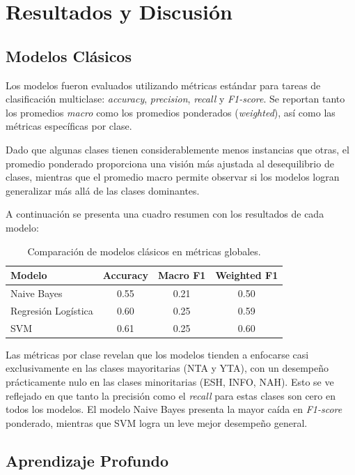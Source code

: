 \section{Resultados y Discusión}

\subsection{Modelos Clásicos}

Los modelos fueron evaluados utilizando métricas estándar para tareas de clasificación multiclase: \textit{accuracy}, \textit{precision}, \textit{recall} y \textit{F1-score}. Se reportan tanto los promedios \textit{macro} como los promedios ponderados (\textit{weighted}), así como las métricas específicas por clase.

Dado que algunas clases tienen considerablemente menos instancias que otras, el promedio ponderado proporciona una visión más ajustada al desequilibrio de clases, mientras que el promedio macro permite observar si los modelos logran generalizar más allá de las clases dominantes.

A continuación se presenta una cuadro resumen con los resultados de cada modelo:

\begin{table}[H]
\centering
\caption{Comparación de modelos clásicos en métricas globales.}
\begin{tabular}{lccc}
\toprule
\textbf{Modelo} & \textbf{Accuracy} & \textbf{Macro F1} & \textbf{Weighted F1} \\
\midrule
Naive Bayes            & 0.55 & 0.21 & 0.50 \\
Regresión Logística    & 0.60 & 0.25 & 0.59 \\
SVM                    & 0.61 & 0.25 & 0.60 \\
\bottomrule
\end{tabular}
\end{table}

Las métricas por clase revelan que los modelos tienden a enfocarse casi exclusivamente en las clases mayoritarias (NTA y YTA), con un desempeño prácticamente nulo en las clases minoritarias (ESH, INFO, NAH). Esto se ve reflejado en que tanto la precisión como el \textit{recall} para estas clases son cero en todos los modelos. El modelo Naive Bayes presenta la mayor caída en \textit{F1-score} ponderado, mientras que SVM logra un leve mejor desempeño general.

\subsection{Aprendizaje Profundo}

